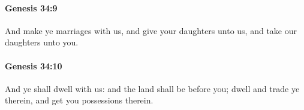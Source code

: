 		\paragraph{Genesis 34:9} %
			\label{GENESIS-34-9}

			And make ye marriages with us, and give your daughters unto us, and take our daughters unto you.


		\paragraph{Genesis 34:10} %
			\label{GENESIS-34-10}

			And ye shall dwell with us: and the land shall be before you; dwell and trade ye therein, and get you possessions therein.


